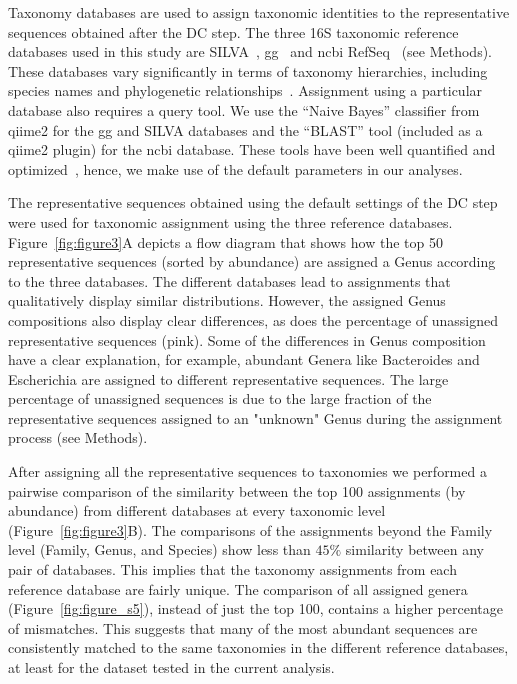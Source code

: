   Taxonomy databases are used to assign taxonomic identities to the representative sequences obtained after the DC step.
  The three 16S taxonomic reference databases used in this study are SILVA~\cite{Quast2012}, \acs{gg}~\cite{DeSantis2006} and \acs{ncbi} RefSeq~\cite{Sayers2009} (see Methods).
  These databases vary significantly in terms of taxonomy hierarchies, including species names and phylogenetic relationships~\cite{Balvociute2017}.
  Assignment using a particular database also requires a query tool.
  We use the ``Naive Bayes'' classifier from \ac{qiime2} for the \ac{gg} and SILVA databases and the ``BLAST'' tool (included as a \ac{qiime2} plugin) for the \ac{ncbi} database.
  These tools have been well quantified and optimized~\cite{bokulichOptimizingTaxonomicClassification2018}, hence, we make use of the default parameters in our analyses.

  The representative sequences obtained using the default settings of the DC step were used for taxonomic assignment using the three reference databases.
  Figure~\ref{fig:figure3}A depicts a flow diagram that shows how the top 50 representative sequences (sorted by abundance) are assigned a Genus according to the three databases.
  The different databases lead to assignments that qualitatively display similar distributions. However, the assigned Genus compositions also display clear differences, as does the percentage of unassigned representative sequences (pink).
  Some of the differences in Genus composition have a clear explanation, for example, abundant Genera like Bacteroides and Escherichia are assigned to different representative sequences.
  The large percentage of unassigned sequences is due to the large fraction of the representative sequences assigned to an "unknown" Genus during the assignment process (see Methods).

  After assigning all the representative sequences to taxonomies we performed a pairwise comparison of the similarity between the top 100 assignments (by abundance) from different databases at every taxonomic level (Figure~\ref{fig:figure3}B).
  The comparisons of the assignments beyond the Family level (Family, Genus, and Species) show less than $45\%$ similarity between any pair of databases.
  This implies that the taxonomy assignments from each reference database are fairly unique.
  The comparison of all assigned genera (Figure~\ref{fig:figure_s5}), instead of just the top 100, contains a higher percentage of mismatches.
  This suggests that many of the most abundant sequences are consistently matched to the same taxonomies in the different reference databases, at least for the dataset tested in the current analysis.

